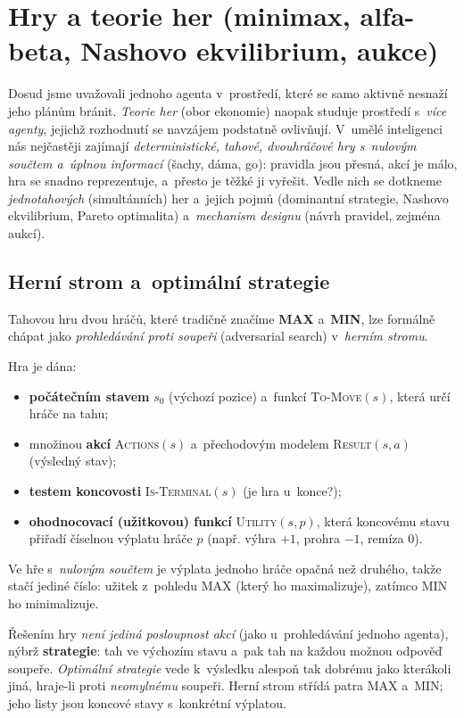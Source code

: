 \section{Hry a teorie her (minimax, alfa-beta, Nashovo ekvilibrium, aukce)}

Dosud jsme uvažovali jednoho agenta v~prostředí, které se samo aktivně nesnaží jeho plánům bránit. \emph{Teorie her} (obor ekonomie) naopak studuje prostředí s~\emph{více agenty}, jejichž rozhodnutí se navzájem podstatně ovlivňují. V~umělé inteligenci nás nejčastěji zajímají \emph{deterministické, tahové, dvouhráčové hry s~nulovým součtem a~úplnou informací} (šachy, dáma, go): pravidla jsou přesná, akcí je málo, hra se snadno reprezentuje, a~přesto je těžké ji vyřešit. Vedle nich se dotkneme \emph{jednotahových} (simultánních) her a~jejich pojmů (dominantní strategie, Nashovo ekvilibrium, Pareto optimalita) a~\emph{mechanism designu} (návrh pravidel, zejména aukcí).

\subsection{Herní strom a~optimální strategie}

Tahovou hru dvou hráčů, které tradičně značíme \textbf{MAX} a~\textbf{MIN}, lze formálně chápat jako \emph{prohledávání proti soupeři} (adversarial search) v~\emph{herním stromu}.

\begin{definice}
Hra je dána:
\begin{itemize}
  \item \textbf{počátečním stavem} $s_0$ (výchozí pozice) a~funkcí \textsc{To-Move}$(s)$, která určí hráče na tahu;
  \item množinou \textbf{akcí} \textsc{Actions}$(s)$ a~přechodovým modelem \textsc{Result}$(s,a)$ (výsledný stav);
  \item \textbf{testem koncovosti} \textsc{Is-Terminal}$(s)$ (je hra u~konce?);
  \item \textbf{ohodnocovací (užitkovou) funkcí} \textsc{Utility}$(s,p)$, která koncovému stavu přiřadí číselnou výplatu hráče $p$ (např. výhra $+1$, prohra $-1$, remíza $0$).
\end{itemize}
Ve hře s~\emph{nulovým součtem} je výplata jednoho hráče opačná než druhého, takže stačí jediné číslo: užitek z~pohledu MAX (který ho maximalizuje), zatímco MIN ho minimalizuje.
\end{definice}

\begin{intuice}
Řešením hry \emph{není jediná posloupnost akcí} (jako u~prohledávání jednoho agenta), nýbrž \textbf{strategie}: tah ve výchozím stavu a~pak tah na každou možnou odpověď soupeře. \emph{Optimální strategie} vede k~výsledku alespoň tak dobrému jako kterákoli jiná, hraje-li proti \emph{neomylnému} soupeři. Herní strom střídá patra MAX a~MIN; jeho listy jsou koncové stavy s~konkrétní výplatou.
\end{intuice}


